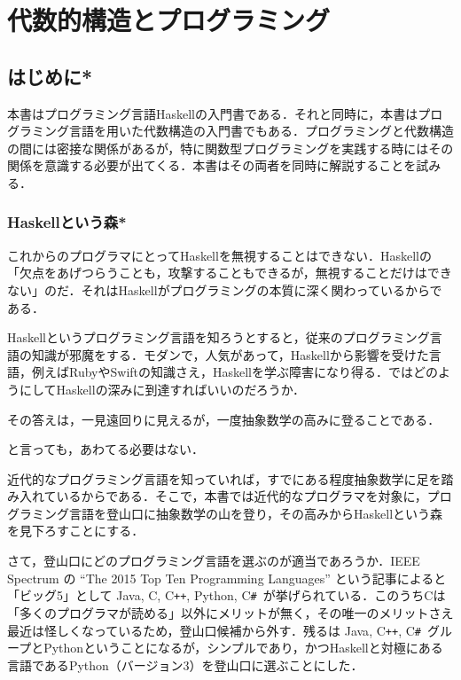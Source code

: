 \documentclass[a4paper,twocolumn]{jsbook}
\newcommand{\programminglanguage}[1]{\textsf{#1}}
\newcommand{\clang}{\programminglanguage{C}}
\newcommand{\csharp}{\programminglanguage{C}\texttt{\#}}
\newcommand{\cxx}{\programminglanguage{C}\texttt{++}}
\newcommand{\haskell}{\programminglanguage{Haskell}}
\newcommand{\java}{\programminglanguage{Java}}
\newcommand{\python}{\programminglanguage{Python}}
\newcommand{\ruby}{\programminglanguage{Ruby}}
\newcommand{\swift}{\programminglanguage{Swift}}
\newenvironment{leader}{\begingroup\gt}{\endgroup}
\begin{document}
\part{代数的構造とプログラミング}

\chapter{はじめに*}

\begin{leader}
本書はプログラミング言語\haskell の入門書である．それと同時に，本書はプログラミング言語を用いた代数構造の入門書でもある．プログラミングと代数構造の間には密接な関係があるが，特に関数型プログラミングを実践する時にはその関係を意識する必要が出てくる．本書はその両者を同時に解説することを試みる．
\end{leader}

\section{\haskell という森*}

これからのプログラマにとって\haskell を無視することはできない．\haskell の「欠点をあげつらうことも，攻撃することもできるが，無視することだけはできない」のだ．それは\haskell がプログラミングの本質に深く関わっているからである．

\haskell というプログラミング言語を知ろうとすると，従来のプログラミング言語の知識が邪魔をする．モダンで，人気があって，\haskell から影響を受けた言語，例えば\ruby や\swift の知識さえ，\haskell を学ぶ障害になり得る．ではどのようにして\haskell の深みに到達すればいいのだろうか．

その答えは，一見遠回りに見えるが，一度抽象数学の高みに登ることである．

と言っても，あわてる必要はない．

近代的なプログラミング言語を知っていれば，すでにある程度抽象数学に足を踏み入れているからである．そこで，本書では近代的なプログラマを対象に，プログラミング言語を登山口に抽象数学の山を登り，その高みから\haskell という森を見下ろすことにする．


さて，登山口にどのプログラミング言語を選ぶのが適当であろうか．IEEE Spectrum の ``The 2015 Top Ten Programming Languages'' という記事によると「ビッグ5」として \java, \clang, \cxx, \python, \csharp\ が挙げられている．このうち\clang は「多くのプログラマが読める」以外にメリットが無く，その唯一のメリットさえ最近は怪しくなっているため，登山口候補から外す．残るは \java, \cxx, \csharp\ グループと\python ということになるが，シンプルであり，かつ\haskell と対極にある言語である\python（バージョン3）を登山口に選ぶことにした．
\end{document}
